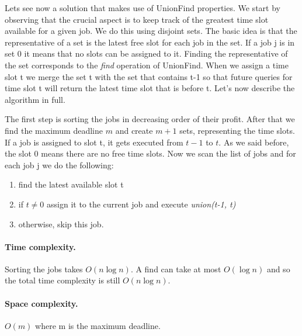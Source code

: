 \documentclass{article}
\begin{document}
\medskip

Lets see now a solution that makes use of UnionFind properties. We start by observing that the crucial aspect
is to keep track of the greatest time slot available for a given job. We do this using disjoint sets. The basic idea is that the representative of a set
is the latest free slot for each job in the set. If a job j is in set 0 it means that no slots can be assigned to it. Finding the representative
of the set corresponds to the \emph{find} operation of UnionFind. When we assign a time slot t
we merge the set t with the set that contains t-1 so that future queries for time slot t will return the latest time slot that is before t. Let's now describe the algorithm in full.

\medskip

The first step is sorting the jobs in decreasing order of their profit. After that we find the maximum deadline $m$ and create $m+1$ sets, representing the time slots.
If a job is assigned to slot t, it gets executed from $t-1$ to $t$. As we said before, the slot 0 means there are no free time slots. Now we scan the list  of jobs and for each job j
we do the following:\begin{enumerate}
    \item find the latest available slot t
    \item if $t \neq 0$ assign it to the current job and
    execute \emph{union(t-1, t)}
    \item otherwise, skip this job.
\end{enumerate}

\paragraph{Time complexity.} Sorting the jobs takes $O(n \log n)$.
A find can take at most $O(\log n)$ and so the total time complexity is still $O(n\log n)$.
\paragraph{Space complexity.} $O(m)$ where m is the maximum deadline.



\end{document}
